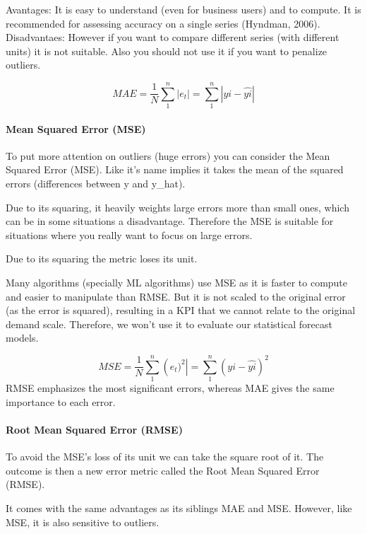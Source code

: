 \documentclass[
]{article}
\begin{document}
Avantages: It is easy to understand (even for business users) and to
compute. It is recommended for assessing accuracy on a single series
(Hyndman, 2006). Disadvantaes: However if you want to compare different
series (with different units) it is not suitable. Also you should not
use it if you want to penalize outliers.

\[MAE = \frac{1}{N}\sum_{1}^{n}\left |e_{t}  \right |=\sum_{1}^{n}\left |yi-\hat{yi} \right|\]

\hypertarget{mean-squared-error-mse}{%
\paragraph{Mean Squared Error (MSE)}\label{mean-squared-error-mse}}

To put more attention on outliers (huge errors) you can consider the
Mean Squared Error (MSE). Like it's name implies it takes the mean of
the squared errors (differences between y and y\_hat).

Due to its squaring, it heavily weights large errors more than small
ones, which can be in some situations a disadvantage. Therefore the MSE
is suitable for situations where you really want to focus on large
errors.

Due to its squaring the metric loses its unit.

Many algorithms (specially ML algorithms) use MSE as it is faster to
compute and easier to manipulate than RMSE. But it is not scaled to the
original error (as the error is squared), resulting in a KPI that we
cannot relate to the original demand scale. Therefore, we won't use it
to evaluate our statistical forecast models.

\[ MSE = \frac{1}{N}\sum_{1}^{n}\left (e_{t})^2  \right|=\sum_{1}^{n}\left (yi-\hat{yi} \right)^2 \]
RMSE emphasizes the most significant errors, whereas MAE gives the same
importance to each error.

\hypertarget{root-mean-squared-error-rmse}{%
\paragraph{Root Mean Squared Error
(RMSE)}\label{root-mean-squared-error-rmse}}

To avoid the MSE's loss of its unit we can take the square root of it.
The outcome is then a new error metric called the Root Mean Squared
Error (RMSE).

It comes with the same advantages as its siblings MAE and MSE. However,
like MSE, it is also sensitive to outliers.
\end{document}
